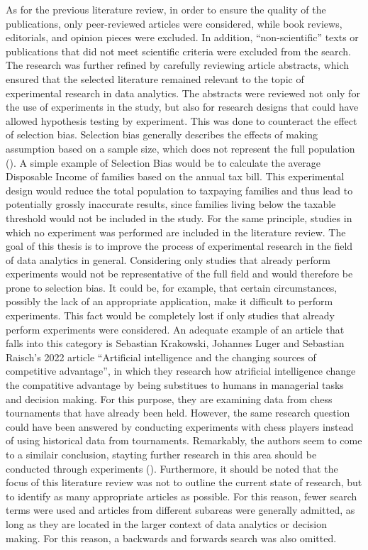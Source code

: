 As for the previous literature review, in order to ensure the quality of the publications, only peer-reviewed articles were considered, while book reviews, editorials, and opinion pieces were excluded. In addition, \enquote{non-scientific} texts or publications that did not meet scientific criteria were excluded from the search. The research was further refined by carefully reviewing article abstracts, which ensured that the selected literature remained relevant to the topic of experimental research in data analytics. The abstracts were reviewed not only for the use of experiments in the study, but also for research designs that could have allowed hypothesis testing by experiment. This was done to counteract the effect of selection bias. Selection bias generally describes the effects of making assumption based on a sample size, which does not represent the full population (\cite{Heckman.2010}). A simple example of Selection Bias would be to calculate the average Disposable Income of families based on the annual tax bill. This experimental design would reduce the total population to taxpaying families and thus lead to potentially grossly inaccurate results, since families living below the taxable threshold would not be included in the study. For the same principle, studies in which no experiment was performed are included in the literature review. The goal of this thesis is to improve the process of experimental research in the field of data analytics in general. Considering only studies that already perform experiments would not be representative of the full field and would therefore be prone to selection bias. It could be, for example, that certain circumstances, possibly the lack of an appropriate application, make it difficult to perform experiments. This fact would be completely lost if only studies that already perform experiments were considered. An adequate example of an article that falls into this category is Sebastian Krakowski, Johannes Luger and Sebastian Raisch's 2022 article \enquote{Artificial intelligence and the changing sources of competitive advantage}, in which they research how atrificial intelligence change the compatitive advantage by being substitues to humans in managerial tasks and decision making. For this purpose, they are examining data from chess tournaments that have already been held. However, the same research question could have been answered by conducting experiments with chess players instead of using historical data from tournaments. Remarkably, the authors seem to come to a similair conclusion, stayting further research in this area should be conducted through experiments (\cite{Krakowski.2022}). Furthermore, it should be noted that the focus of this literature review was not to outline the current state of research, but to identify as many appropriate articles as possible. For this reason, fewer search terms were used and articles from different subareas were generally admitted, as long as they are located in the larger context of data analytics or decision making. For this reason, a backwards and forwards search was also omitted.
